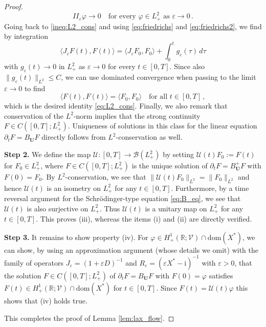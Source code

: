\documentclass[11pt,reqno]{amsart}
\theoremstyle{definition}
\theoremstyle{remark}
\theoremstyle{remark}
\numberwithin{equation}{section}
\newcommand{\R}{\mathbb{R}}
\newcommand{\UU}{\mathcal{U}}
\newcommand{\VV}{\mathcal{V}}
\newcommand{\dom}{\mathrm{dom}}
\newcommand{\pt}{\partial}
\newcommand{\be}{\begin{equation}}
\newcommand{\ee}{\end{equation}}
\newcommand{\eps}{\varepsilon}
\newcommand{\ii}{\mathrm{i}}
\newcommand{\Ub}{\mathbf{U}}
\renewcommand{\phi}{\varphi}
\begin{document}
\begin{appendix}
\begin{proof}
\be \label{eq:friedrichs2}
II_\eps \phi \to 0 \quad \mbox{for every $\phi \in L^2_+$ as $\eps \to 0$} \, .
\ee
Going back to \eqref{ineq:L2_cons} and using \eqref{eq:friedrichs} and \eqref{eq:friedrichs2}, we find by integration
$$
\langle J_\eps F(t), F(t) \rangle = \langle J_\eps F_0, F_0 \rangle + \int_0^t g_\eps(\tau) \, d\tau
$$
with $g_\eps(t) \to 0$ in $L^2_+$ as $\eps \to 0$ for every $t \in [0,T]$. Since also $\| g_\eps(t) \|_{L^2} \leq C$, we can use dominated convergence when passing to the limit $\eps \to 0$ to find
$$
\langle F(t), F(t) \rangle = \langle F_0, F_0 \rangle \quad \mbox{for all $t \in [0,T]$} \, ,
$$
which is the desired identity \eqref{eq:L2_cons}. Finally, we also remark that conservation of the $L^2$-norm implies that the strong continuity $F \in C([0,T]; L^2_+)$. Uniqueness of solutions in this class for the linear equation $\pt_t F = B_{\Ub} F$ directly follows from $L^2$-conservation as well.

\medskip
\textbf{Step 2.} We define the map $\UU : [0,T] \to \mathcal{B}(L^2_+)$ by setting $\UU(t) F_0 := F(t)$ for $F_0 \in L^2_+$, where $F \in C([0,T]; L^2_+)$ is the unique solution of $\pt_t F = B_{\Ub}^+ F$ with $F(0)=F_0$. By $L^2$-conservation, we see that $\| \UU(t) F_0 \|_{L^2} = \| F_0 \|_{L^2}$ and hence $\UU(t)$ is an isometry on $L^2_+$ for any $t \in [0,T]$. Furthermore, by a time reversal argument for the Schr\"odinger-type equation \eqref{eq:B_eq}, we see that $\UU(t)$ is also surjective on $L^2_+$. Thus $\UU(t)$ is a unitary map on $L^2_+$ for any $t \in [0,T]$. This proves (iii), whereas the items (i) and (ii) are directly verified.


\medskip
\textbf{Step 3.} It remains to show property (iv). For $\phi \in H^1_+(\R;\VV) \cap \dom(X^*)$, we can show, by using an approximation argument (whose details we omit) with the family of operators $J_\eps=(1+\eps D)^{-1}$  and $R_\eps=(\eps X^* - \ii)^{-1}$ with $\eps > 0$, that the solution $F \in C([0,T]; L^2_+)$ of $\pt_t F = B_\Ub F$ with $F(0)=\phi$ satisfies $F(t) \in H^1_+(\R; \VV) \cap \dom(X^*)$ for $t \in [0,T]$. Since $F(t)=\UU(t) \phi$ this shows that (iv) holds true.

This completes the proof of Lemma \ref{lem:lax_flow}.
\end{proof}

\end{appendix}



\end{document}
